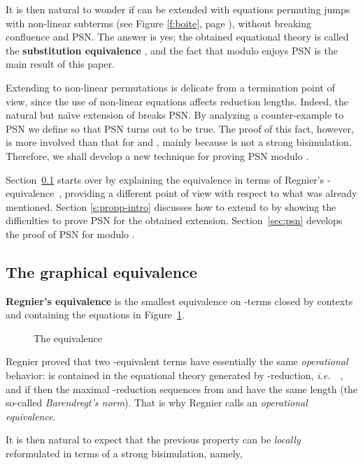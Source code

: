 \documentclass{LMCS}
\newcommand{\ie}{{\it  i.e.}~}
\renewcommand{\>}{\rightarrow}
\newcommand{\deft}[1]{{\bf #1}}
\begin{document}
It is then natural to wonder if  can be extended with
equations permuting jumps with non-linear subterms (see Figure
\ref{f:boite}, page \pageref{f:boite}), without breaking confluence
and PSN. The answer is yes; the obtained equational
theory is called the \textbf{substitution equivalence} , and the
fact that  modulo  enjoys PSN is the main result of this
paper.\medskip

Extending  to non-linear permutations
is delicate from a termination point of view, since the use of
non-linear equations affects reduction lengths. Indeed, the natural
but na\"{\i}ve extension of  breaks PSN. By analyzing a
counter-example to PSN we define  so that PSN turns out to be true. The
proof of this fact, however, is more involved than that for  and
, mainly because  is not a strong bisimulation.
Therefore, we shall develop a new technique for proving
PSN modulo .\medskip

Section~\ref{s:regnier} starts over by explaining
the equivalence  in terms of Regnier's -equivalence~\cite{regnier94}, 
providing a different point of view with respect to what was already
mentioned. Section \ref{s:propp-intro} discusses 
how to extend  to  by
    showing the difficulties to prove PSN for  the obtained extension.  Section~\ref{sec:psn} develops the proof of PSN for  modulo .


\subsection{The graphical equivalence}
\label{s:regnier}

\deft{Regnier's equivalence}  is the smallest
equivalence on -terms closed by contexts and containing the 
equations in Figure~\ref{f:regnier}. 
\begin{figure}[ht]

\caption{The  equivalence  }
\label{f:regnier}
\end{figure}

\noindent Regnier proved that two -equivalent terms have
essentially the same {\it operational} behavior:  is contained
in the equational theory generated by -reduction, \ie\ 
, and if  then 
the maximal -reduction
sequences from  and  have the same length (the
so-called \textit{Barendregt's norm}). That is why Regnier calls  an \textit{operational
  equivalence}. \medskip

It is then natural to expect that 
the previous property can be \textit{locally} reformulated in terms of a
strong
bisimulation, namely, 
 
\end{document}
